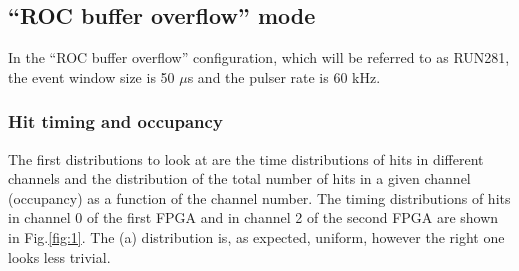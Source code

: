 \subsection{``ROC buffer overflow'' mode}
In the ``ROC buffer overflow'' configuration, which will be referred to as RUN281, the event window size is 50 $\mu$s
and the pulser rate is 60 kHz.

\subsubsection{Hit timing and occupancy}\label{over}
The first distributions to look at are the time distributions of hits in 
different channels and the distribution of the total number of hits
in a given channel (occupancy) as a function of the channel number.
The timing distributions of hits in channel 0 of the first FPGA
and in channel 2 of the second FPGA are shown in Fig.\ref{fig:1}.
The (a) distribution is, as expected, uniform, however the right one looks
less trivial.

